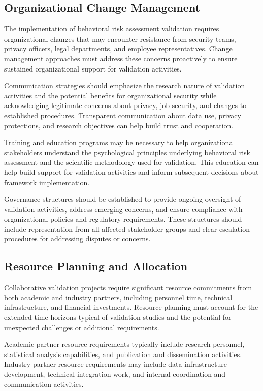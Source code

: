 \documentclass[10pt,twocolumn]{IEEEtran}
\begin{document}
\subsection{Organizational Change Management}

The implementation of behavioral risk assessment validation requires organizational changes that may encounter resistance from security teams, privacy officers, legal departments, and employee representatives. Change management approaches must address these concerns proactively to ensure sustained organizational support for validation activities.

Communication strategies should emphasize the research nature of validation activities and the potential benefits for organizational security while acknowledging legitimate concerns about privacy, job security, and changes to established procedures. Transparent communication about data use, privacy protections, and research objectives can help build trust and cooperation.

Training and education programs may be necessary to help organizational stakeholders understand the psychological principles underlying behavioral risk assessment and the scientific methodology used for validation. This education can help build support for validation activities and inform subsequent decisions about framework implementation.

Governance structures should be established to provide ongoing oversight of validation activities, address emerging concerns, and ensure compliance with organizational policies and regulatory requirements. These structures should include representation from all affected stakeholder groups and clear escalation procedures for addressing disputes or concerns.

\subsection{Resource Planning and Allocation}

Collaborative validation projects require significant resource commitments from both academic and industry partners, including personnel time, technical infrastructure, and financial investments. Resource planning must account for the extended time horizons typical of validation studies and the potential for unexpected challenges or additional requirements.

Academic partner resource requirements typically include research personnel, statistical analysis capabilities, and publication and dissemination activities. Industry partner resource requirements may include data infrastructure development, technical integration work, and internal coordination and communication activities.
\end{document}
